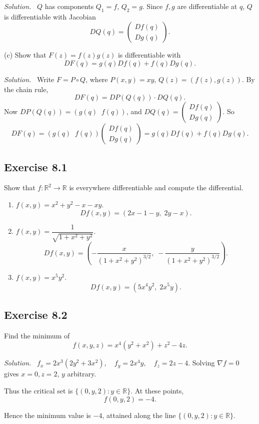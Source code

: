 \documentclass[11pt,a4paper]{article}
\newenvironment{solution}{\par\noindent\textit{Solution.}\ }{\par\vspace{0.5em}}
\begin{document}
\begin{solution}
	$Q$ has components $Q_1=f$, $Q_2=g$. Since $f,g$ are differentiable at $q$, 
	$Q$ is differentiable with Jacobian
	\[
	DQ(q)=\begin{pmatrix} Df(q) \\ Dg(q) \end{pmatrix}.
	\]
\end{solution}

(c) Show that $F(z)=f(z)g(z)$ is differentiable with
\[
DF(q)=g(q)Df(q)+f(q)Dg(q).
\]

\begin{solution}
	Write $F=P\circ Q$, where $P(x,y)=xy$, $Q(z)=(f(z),g(z))$.  
	By the chain rule,
	\[
	DF(q)=DP(Q(q))\cdot DQ(q).
	\]
	Now $DP(Q(q))=(g(q)\;\; f(q))$, and $DQ(q)=\begin{pmatrix}Df(q)\\Dg(q)\end{pmatrix}$.  
	So
	\[
	DF(q)=(g(q)\;\; f(q))\begin{pmatrix}Df(q)\\Dg(q)\end{pmatrix}
	= g(q)Df(q)+f(q)Dg(q).
	\]
\end{solution}

\subsection*{Exercise 8.1}
Show that $f:\mathbb{R}^2\to\mathbb{R}$ is everywhere differentiable and compute the differential.

\begin{enumerate}[label=\alph*)]
	\item $f(x,y)=x^2+y^2-x-xy$.  
	\[
	Df(x,y)=(2x-1-y,\;2y-x).
	\]
	
	\item $f(x,y)=\dfrac{1}{\sqrt{1+x^2+y^2}}$.  
	\[
	Df(x,y)=\left(-\frac{x}{(1+x^2+y^2)^{3/2}},\; -\frac{y}{(1+x^2+y^2)^{3/2}}\right).
	\]
	
	\item $f(x,y)=x^5y^2$.  
	\[
	Df(x,y)=(5x^4y^2,\;2x^5y).
	\]
\end{enumerate}


\subsection*{Exercise 8.2}
Find the minimum of 
\[
f(x,y,z)=x^4(y^2+x^2)+z^2-4z.
\]

\begin{solution}
	$f_x=2x^3(2y^2+3x^2),\quad f_y=2x^4y,\quad f_z=2z-4$.  
	Solving $\nabla f=0$ gives $x=0, z=2$, $y$ arbitrary.  
	
	Thus the critical set is $\{(0,y,2): y\in\mathbb{R}\}$.  
	At these points, 
	\[
	f(0,y,2)=-4.
	\]
	
	Hence the minimum value is $-4$, attained along the line $\{(0,y,2):y\in\mathbb{R}\}$.
\end{solution}
\end{document}
